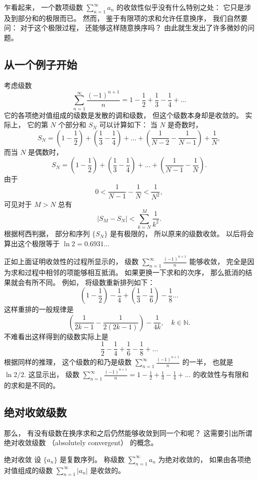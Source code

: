 

乍看起来， 一个数项级数 $\sum_{n=1}^\infty a_n$ 的收敛性似乎没有什么特别之处： 它只是涉及到部分和的极限而已。 然而， 鉴于有限项的求和允许任意换序， 我们自然要问： 对于这个极限过程， 还能够这样随意换序吗？ 由此就生发出了许多微妙的问题。

\subsection{从一个例子开始}

考虑级数
$$
\sum_{n=1}^\infty\frac{(-1)^{n+1}}{n}
=1-\frac{1}{2}+\frac{1}{3}-\frac{1}{4}+...
$$
它的各项绝对值组成的级数是发散的调和级数， 但这个级数本身却是收敛的。 实际上， 它的第 $N$ 个部分和 $S_N$ 可以计算如下： 当 $N$ 是奇数时，
$$
S_N=\left(1-\frac{1}{2}\right)+\left(\frac{1}{3}-\frac{1}{4}\right)+...+\left(\frac{1}{N-2}-\frac{1}{N-1}\right)+\frac{1}{N},
$$
而当 $N$ 是偶数时，
$$
S_N=\left(1-\frac{1}{2}\right)+\left(\frac{1}{3}-\frac{1}{4}\right)+...+\left(\frac{1}{N-1}-\frac{1}{N}\right).
$$
由于
$$
0<\frac{1}{N-1}-\frac{1}{N}<\frac{1}{N^2},
$$
可见对于 $M>N$ 总有
$$
|S_M-S_N|<\sum_{k=N}^M\frac{1}{k^2}.
$$
根据柯西判据， 部分和序列 $\{S_N\}$ 是有极限的， 所以原来的级数收敛。 以后将会算出这个极限等于 $\ln2=0.6931...$

正如上面证明收敛性的过程所显示的， 级数 $\sum_{n=1}^\infty\frac{(-1)^{n+1}}{n}$ 能够收敛， 完全是因为求和过程中相邻的项能够相互抵消。 如果更换一下求和的次序， 那么抵消的结果就会有所不同。 例如， 将级数重新排列如下：
$$
\left(1-\frac{1}{2}\right)-\frac{1}{4}+\left(\frac{1}{3}-\frac{1}{6}\right)-\frac{1}{8}...
$$
这样重排的一般规律是
$$
\left(\frac{1}{2k-1}-\frac{1}{2(2k-1)}\right)-\frac{1}{4k},
\quad k\in\mathbb{N}.
$$
不难看出这样得到的级数实际上是
$$
\frac{1}{2}-\frac{1}{4}+\frac{1}{6}-\frac{1}{8}+...
$$
根据同样的推理， 这个级数的和乃是级数 $\sum_{n=1}^\infty\frac{(-1)^{n+1}}{n}$ 的一半， 也就是 $\ln2/2$. 这显示出， 级数 $\sum_{n=1}^\infty\frac{(-1)^{n+1}}{n}
=1-\frac{1}{2}+\frac{1}{3}-\frac{1}{4}+...$ 的收敛性与有限和的求和是不同的。

\subsection{绝对收敛级数}

那么， 有没有级数在换序求和之后仍然能够收敛到同一个和呢？ 这需要引出所谓绝对收敛级数 （absolutely convergent） 的概念。

\begin{definition}{绝对收敛}
设 $\{a_n\}$ 是复数序列。 称级数 $\sum_{n=1}^\infty a_n$ 为绝对收敛的， 如果由各项绝对值组成的级数 $\sum_{n=1}^\infty|a_n|$ 是收敛的。
\end{definition}

